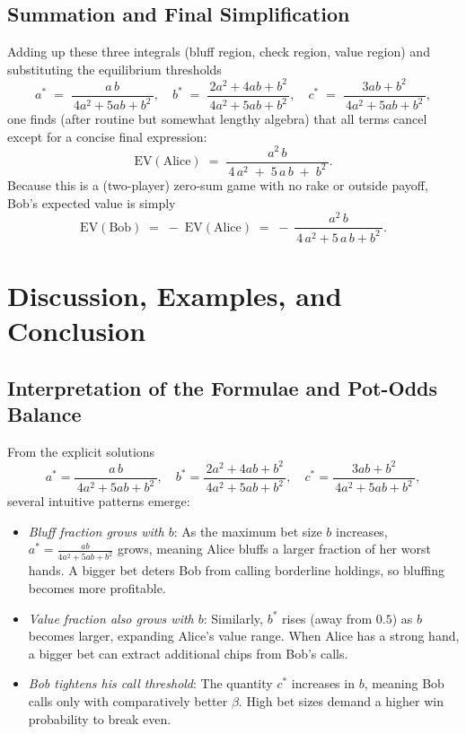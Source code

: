 \documentclass{article}
\begin{document}
\subsection{Summation and Final Simplification}

Adding up these three integrals (bluff region, check region, value region) and substituting the equilibrium thresholds 
\[
a^*\;=\;\frac{\,a\,b\,}{\,4a^2 +5ab + b^2\,},\quad
b^*\;=\;\frac{\,2a^2 +4ab + b^2\,}{\,4a^2 +5ab + b^2\,},\quad
c^*\;=\;\frac{\,3ab + b^2\,}{\,4a^2 +5ab + b^2\,},
\]
one finds (after routine but somewhat lengthy algebra) that all terms cancel except for a concise final expression:
\begin{equation}
\text{EV}(\text{Alice}) 
\;=\; 
\frac{\,a^{2}\,b\,}{\,4\,a^{2} \;+\; 5\,a\,b \;+\; b^{2}\,}.
\label{Eq:AliceEV}
\end{equation}
Because this is a (two-player) zero-sum game with no rake or outside payoff, Bob's expected value is simply
\[
\text{EV}(\text{Bob})
\;=\;
-\;\text{EV}(\text{Alice})
\;=\;
-\,\frac{\,a^{2}\,b\,}{\,4\,a^{2} + 5\,a\,b + b^{2}\,}.
\]


\section{Discussion, Examples, and Conclusion}
\label{sec:DiscussionConclusion}

\subsection{Interpretation of the Formulae and Pot-Odds Balance}

From the explicit solutions
\[
\boxed{
a^* 
= \frac{\,a\,b\,}{\,4a^2 + 5ab + b^2\,}, 
\quad
b^*
= \frac{\,2a^2 + 4ab + b^2\,}{\,4a^2 + 5ab + b^2\,}, 
\quad
c^*
= \frac{\,3ab + b^2\,}{\,4a^2 +5ab + b^2\,},
}
\]
several intuitive patterns emerge:

\begin{itemize}
\item 
\emph{Bluff fraction grows with $b$}:
As the maximum bet size $b$ increases, $a^* = \tfrac{ab}{4a^2 + 5ab + b^2}$ grows, meaning Alice bluffs a larger fraction of her worst hands. A bigger bet deters Bob from calling borderline holdings, so bluffing becomes more profitable.
\item 
\emph{Value fraction also grows with $b$}:
Similarly, $b^*$ rises (away from $0.5$) as $b$ becomes larger, expanding Alice's value range. When Alice has a strong hand, a bigger bet can extract additional chips from Bob's calls.
\item 
\emph{Bob tightens his call threshold}:
The quantity $c^*$ increases in $b$, meaning Bob calls only with comparatively better $\beta$. High bet sizes demand a higher win probability to break even.
\end{itemize}
\end{document}
